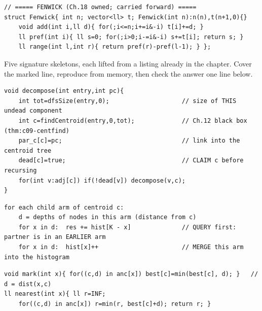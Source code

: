 \begin{lstlisting}
// ===== FENWICK (Ch.18 owned; carried forward) =====
struct Fenwick{ int n; vector<ll> t; Fenwick(int n):n(n),t(n+1,0){}
    void add(int i,ll d){ for(;i<=n;i+=i&-i) t[i]+=d; }
    ll pref(int i){ ll s=0; for(;i>0;i-=i&-i) s+=t[i]; return s; }
    ll range(int l,int r){ return pref(r)-pref(l-1); } };
\end{lstlisting}


Five signature skeletons, each lifted from a listing already in the chapter. Cover the marked line,
reproduce from memory, then check the answer one line below.

\begin{lstlisting}[caption={Drill 1 -- decompose-and-recurse: find the centroid, claim it, recurse on each piece (from lst:c18-build)}]
void decompose(int entry,int pc){
    int tot=dfsSize(entry,0);                    // size of THIS undead component
    int c=findCentroid(entry,0,tot);             // Ch.12 black box (thm:c09-centfind)
    par_c[c]=pc;                                 // link into the centroid tree
    dead[c]=true;                                // CLAIM c before recursing
    for(int v:adj[c]) if(!dead[v]) decompose(v,c);
}
\end{lstlisting}

\begin{lstlisting}[caption={Drill 2 -- the arm histogram count: query accumulated arms, then merge (from lst:c18-count)}]
for each child arm of centroid c:
    d = depths of nodes in this arm (distance from c)
    for x in d:  res += hist[K - x]              // QUERY first: partner is in an EARLIER arm
    for x in d:  hist[x]++                       // MERGE this arm into the histogram
\end{lstlisting}

\begin{lstlisting}[caption={Drill 3 -- the distance index: mark and nearest over centroid ancestors (from lst:c18-index)}]
void mark(int x){ for((c,d) in anc[x]) best[c]=min(best[c], d); }   // d = dist(x,c)
ll nearest(int x){ ll r=INF;
    for((c,d) in anc[x]) r=min(r, best[c]+d); return r; }
\end{lstlisting}

